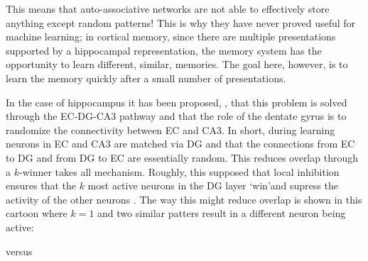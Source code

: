 \documentclass[12pt]{article}
\begin{document}
This means that auto-associative networks are not able to effectively
store anything except random patterns! This is why they have never
proved useful for machine learning; in cortical memory, since there
are multiple presentations supported by a hippocampal representation,
the memory system has the opportunity to learn different, similar,
memories. The goal here, however, is to learn the memory quickly after
a small number of presentations.

In the case of hippocampus it has been proposed,
\cite{OReillyMcClelland1994a}, that this problem is solved through the
EC-DG-CA3 pathway and that the role of the dentate gyrus is to
randomize the connectivity between EC and CA3. In short, during
learning neurons in EC and CA3 are matched via DG and that the
connections from EC to DG and from DG to EC are essentially
random. This reduces overlap through a $k$-winner takes all
mechanism. Roughly, this supposed that local inhibition ensures that
the $k$ most active neurons in the DG layer \lq{}win\rq and supress
the activity of the other neurons \cite{OReillyMcClelland1994a}. The
way this might reduce overlap is shown in this cartoon where $k=1$ and
two similar patters result in a different neuron being active:
\begin{center}
\end{center}
versus
\begin{center}
\end{center}
\end{document}
